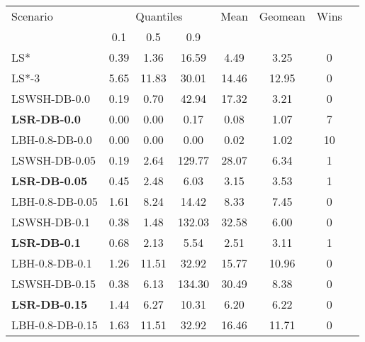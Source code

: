 \documentclass[3p, authoryear, times, doubleblind]{elsarticle}
\begin{document}
{\begin{table}[h]
\centering
\caption{}
\label{tab:primal_gap_db_GT}
\begin{tabular}{lccccccc}
\toprule
{Scenario} & \multicolumn{3}{c}{Quantiles} & {Mean} & {Geomean} & {Wins} \\
{} & {0.1} & {0.5} & {0.9} & {} & {} & {} \\
\midrule
LS* & 0.39 & 1.36 & 16.59 & 4.49 & 3.25 & 0 \\
LS*-3 & 5.65 & 11.83 & 30.01 & 14.46 & 12.95 & 0 \\
LSWSH-DB-0.0 & 0.19 & 0.70 & 42.94 & 17.32 & 3.21 & 0 \\
\textbf{LSR-DB-0.0} & 0.00 & 0.00 & 0.17 & 0.08 & 1.07 & 7 \\
LBH-0.8-DB-0.0 & 0.00 & 0.00 & 0.00 & 0.02 & 1.02 & 10 \\
LSWSH-DB-0.05 & 0.19 & 2.64 & 129.77 & 28.07 & 6.34 & 1 \\
\textbf{LSR-DB-0.05} & 0.45 & 2.48 & 6.03 & 3.15 & 3.53 & 1 \\
LBH-0.8-DB-0.05 & 1.61 & 8.24 & 14.42 & 8.33 & 7.45 & 0 \\
LSWSH-DB-0.1 & 0.38 & 1.48 & 132.03 & 32.58 & 6.00 & 0 \\
\textbf{LSR-DB-0.1} & 0.68 & 2.13 & 5.54 & 2.51 & 3.11 & 1 \\
LBH-0.8-DB-0.1 & 1.26 & 11.51 & 32.92 & 15.77 & 10.96 & 0 \\
LSWSH-DB-0.15 & 0.38 & 6.13 & 134.30 & 30.49 & 8.38 & 0 \\
\textbf{LSR-DB-0.15} & 1.44 & 6.27 & 10.31 & 6.20 & 6.22 & 0 \\
LBH-0.8-DB-0.15 & 1.63 & 11.51 & 32.92 & 16.46 & 11.71 & 0 \\
\bottomrule
\end{tabular}
\end{table}


}
\end{document}
